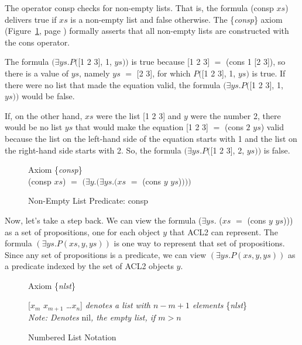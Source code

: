 The operator 
\textsf{consp}
checks for non-empty lists.
That is, the formula \textsf{(consp $xs$)} delivers true
if $xs$ is a non-empty list and false otherwise.
The \{\emph{consp}\} axiom
(Figure~\ref{consp-axiom}, page \pageref{consp-axiom})
formally asserts that all non-empty lists
are constructed with the \textsf{cons} operator.

The formula
$(\exists ys.P($\textsf{[1 2 3]}, \textsf{1}, $ys))$ is true
because \textsf{[1 2 3]} $=$ \textsf{(cons 1 [2 3])},
so there is a value of $ys$, namely $ys$ $=$ \textsf{[2 3]},
for which $P($\textsf{[1 2 3]}, \textsf{1}, $ys)$ is true.
If there were no list that made the equation valid,
the formula $(\exists ys.P($[1 2 3], \textsf{1}, $ys))$
would be false.

If, on the other hand, $xs$ were the list \textsf{[1 2 3]}
and $y$ were the number 2, there would be no list
$ys$ that would make the equation \textsf{[1 2 3]} $=$ \textsf{(cons $2$ $ys$)} valid
because the list on the left-hand side of the equation
starts with 1 and the list on the right-hand side starts with 2.
So, the formula $(\exists ys.P($\textsf{[1 2 3]}, \textsf{2}, $ys))$
is false.

\begin{figure}
\begin{center}
Axiom \{\emph{consp}\} \\
\textsf{(consp $xs$)} $=$  $(\exists y.(\exists ys.(xs$ $=$ \textsf{(cons $y$ $ys$)}$)))$
\end{center}
\caption{Non-Empty List Predicate: consp}
\label{consp-axiom}
\end{figure}

Now, let's take a step back.
We can view the formula
($\exists ys.$ ($xs$ $=$ \textsf{(cons $y$ $ys$)}))
as a set of propositions,
one for each object $y$ that ACL2 can represent.
The formula
$(\exists ys.P(xs, y, ys))$ is one way to represent that
set of propositions.
Since any set of propositions is a predicate,
we can view $(\exists ys.P(xs, y, ys))$ as a predicate indexed
by the set of ACL2 objects $y$.

\begin{figure}
\begin{center}
Axiom \{\emph{nlst}\}

\textsf{[$x_{m}$  $x_{m+1}$ \dots $x_{n}$]}  \emph{denotes a list with $n - m + 1$ elements} \{\emph{nlst}\} \\
\emph{Note: Denotes} \textsf{nil}\emph{, the empty list, if $m > n$}
\end{center}
\caption{Numbered List Notation}
\label{numbered-list-interpretation}
\end{figure}

